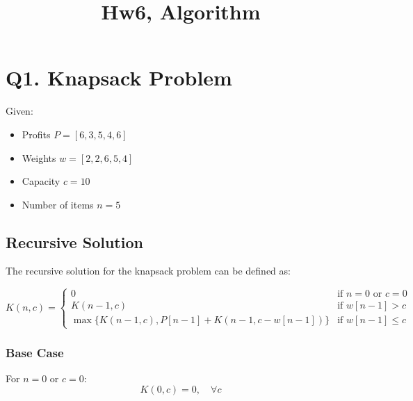 \documentclass{article}
\begin{document}
\title{Hw6, Algorithm}
\author{}
\date{}
\maketitle

\section{Q1. Knapsack Problem}

Given:
\begin{itemize}
    \item Profits \( P = [6, 3, 5, 4, 6] \)
    \item Weights \( w = [2, 2, 6, 5, 4] \)
    \item Capacity \( c = 10 \)
    \item Number of items \( n = 5 \)
\end{itemize}

\subsection*{Recursive Solution}
The recursive solution for the knapsack problem can be defined as:

\[
    K(n, c) =
    \begin{cases}
        0                                            & \text{if } n = 0 \text{ or } c = 0 \\
        K(n-1, c)                                    & \text{if } w[n-1] > c              \\
        \max\{K(n-1, c), P[n-1] + K(n-1, c-w[n-1])\} & \text{if } w[n-1] \leq c
    \end{cases}
\]

\subsubsection*{Base Case}
For \( n = 0 \) or \( c = 0 \):
\[
    K(0, c) = 0, \quad \forall c
\]
\end{document}
